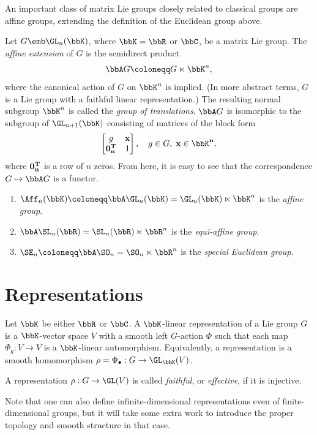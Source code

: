 An important class of matrix Lie groups closely related to classical groups are affine groups, extending the definition of the Euclidean group above.

\begin{defn}
    Let $G\emb \GL_n(\bbK)$, where $\bbK=\bbR$ or $\bbC$, be a matrix Lie group. The \emph{affine extension} of $G$ is the semidirect product 
    \[\bbA G\coloneqq G\ltimes \bbK^n,\]
    where the canonical action of $G$ on $\bbK^n$ is implied. (In more abstract terms, $G$ is a Lie group with a faithful linear representation.) The resulting normal subgroup $\bbK^n$ is called the \emph{group of translations}. $\bbA G$ is isomorphic to the subgroup of $\GL_{n+1}(\bbK)$ consisting of matrices of the block form
    \[\begin{bmatrix}
        g & \bf{x}\\
        \bf{0}_n^T & 1
    \end{bmatrix},\quad g\in G,\; \bf{x}\in\bbK^n,\]
    where $\bf{0}_n^T$ is a row of $n$ zeros. From here, it is easy to see that the correspondence $G\mapsto \bbA G$ is a functor.
\end{defn}

\begin{example}
    \begin{enumerate}
        \item $\Aff_n(\bbK)\coloneqq \bbA \GL_n(\bbK)=\GL_n(\bbK)\ltimes\bbK^n$ is the \emph{affine group}.
        \item $\bbA \SL_n(\bbR)=\SL_n(\bbR)\ltimes \bbR^n$ is the \emph{equi-affine group}.
        \item $\SE_n\coloneqq \bbA \SO_n{}= \SO_n\ltimes\bbR^n$ is the \emph{special Euclidean group}.
    \end{enumerate}
\end{example}










\section{Representations}

\begin{defn}
    Let $\bbK$ be either $\bbR$ or $\bbC$. A $\bbK$-linear representation of a Lie group $G$ is a $\bbK$-vector space $V$ with a smooth left $G$-action $\Phi$ such that each map $\Phi_g:V\to V$ is a $\bbK$-linear automorphism. Equivalently, a representation is a smooth homomorphism $\rho=\Phi_\bullet:G\to \GL_{\bbK}(V)$. 

    A representation $\rho :G\to \GL(V)$ is called \emph{faithful}, or \emph{effective}, if it is injective.
\end{defn}
Note that one can also define infinite-dimensional representations even of finite-dimensional groups, but it will take some extra work to introduce the proper topology and smooth structure in that case.

